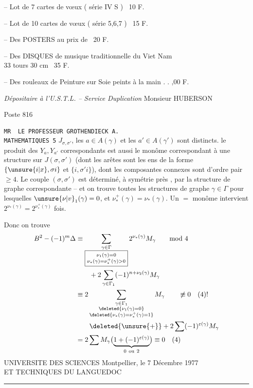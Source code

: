 -- Lot de 7 cartes de vœux ( série IV S ) \dotfill\ 10 F.

-- Lot de 10 cartes de vœux ( série 5,6,7 ) \dotfill\ 15 F.

-- Des POSTERS au prix de \dotfill\ 20 F.

-- Des DISQUES de musique traditionnelle du Viet Nam\\
\hspace*{3em}33 tours 30 cm \dotfill\ 35 F.

-- Des rouleaux de Peinture sur Soie peints à la main . . ,00 F.

\textit{Dépositaire à l'U.S.T.L. -- Service Duplication} Monsieur HUBERSON

Poste 816

\texttt{MR \ LE PROFESSEUR GROTHENDIECK A.}\\
\texttt{MATHEMATIQUES \hspace{7em} 5}
$J_{\sigma,\sigma'}$,  les $a\in A(\gamma)$ et les $a'\in A(\gamma')$ sont distincts.  le produit des $Y_a,Y_{a'}$ correspondants est aussi le monôme correspondant à une structure   sur $J(\sigma,\sigma')$ (dont les arêtes sont les ens de la forme $\{\unsure{i|x},\sigma i\}$ et $\{i,\sigma'i\}$), dont les composantes connexes sont d'ordre pair $\geq4$. Le couple $(\sigma,\sigma')$ est déterminé, à symétrie près , par la structure de graphe correspondante -- et on trouve  toutes les structures de graphe $\gamma\in\Gamma$ pour lesquelles  $\unsure{\nu|v}_1(\gamma)=0$, et  $\nu_*^+(\gamma)=\nu_*(\gamma)$. Un $=$ monôme intervient $2^{\nu_*(\gamma)}=2^{\nu_*^+(\gamma)}$ fois.

Donc on trouve
\[
\begin{aligned}
B^2-(-1)^m\Delta &\equiv
\sum_{\substack{\gamma\in\Gamma\\\boxed{\substack{\nu_1(\gamma)=0\\\nu_*(\gamma)=\nu_*^+(\gamma)>0}}}}
2^{\nu_*(\gamma)}M_\gamma\qquad\mathrm{mod}\ 4\\
&\qquad+2\sum_{\gamma\in\Gamma_1}(-1)^{n+\nu_2(\gamma)}M_\gamma\\
&\equiv2\sum_{\substack{\gamma\in\Gamma_1\\\deleted{\nu_1(\gamma)=0}\\\deleted{\nu_*(\gamma)=\nu_*^+(\gamma)=1}}}M_\gamma\qquad\not\equiv0\quad(4)!\\
&\qquad\deleted{\unsure{+}}+2\sum(-1)^{\varepsilon(\gamma)}M_\gamma\\
&=2\sum M_\gamma\bigl(\underbrace{1+(-1)^{\varepsilon(\gamma)}}_{0\ \mathrm{ou}\ 2}\bigr)\equiv0\quad(4)
\end{aligned}
\]
UNIVERSITE DES SCIENCES \hfill Montpellier, le 7 Décembre 1977\\
ET TECHNIQUES DU LANGUEDOC\\
\hspace*{2em}\rule{3.3em}{0.4pt}

